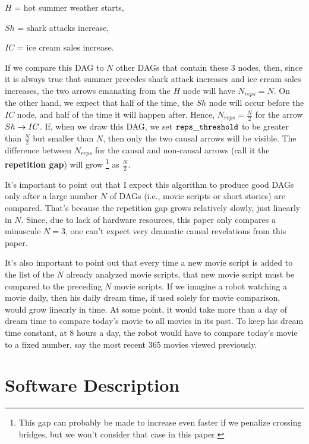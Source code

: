 \documentclass[12pt]{article}
\begin{document}
$H$ = hot summer weather starts,

$Sh$ = shark attacks increase, 

$IC$ = ice cream sales increase.

If we compare this DAG to $N$
other DAGs that contain these 3 nodes,
then, since it is always true
that summer precedes shark
attack increases and ice cream sales increases, the two arrows 
emanating
from the $H$ node 
will have $N_{reps} =N$.
On the other hand, we expect that half of the time, the $Sh$ node will occur before
the $IC$ node,
and half of the time it will happen after.
Hence, $N_{reps}=\frac{N}{2}$ for the
arrow $Sh\rightarrow IC$.
If, when we draw this DAG, we set $\tt reps\_threshold$ to be 
greater than $\frac{N}{2}$
but smaller than $N$,
then only the two causal arrows will be visible. The difference  between
 $N_{reps}$ for the causal and non-causal
 arrows (call it the {\bf repetition gap}) will grow \footnote{This gap
  can probably be made to increase
  even faster if we penalize crossing
  bridges, but 
  we won't consider that case in this paper.}
   as $\frac{N}{2}$.
   
   
 It's important to point out
 that I expect this algorithm
 to produce good DAGs only
 after a large number $N$ of DAGs (i.e.,
 movie scripts or short stories)
 are compared. That's because the repetition gap
 grows relatively slowly, just linearly in $N$. Since,
 due to lack of hardware resources,
 this paper
 only compares a minuscule $N=3$,
 one can't expect very dramatic causal
 revelations from this paper.

It's also important to point out
that every time a new movie script is added to
the list of the $N$ already
analyzed movie scripts,
that new movie script must be compared to the
preceding $N$ movie scripts.
If we imagine a robot watching a movie daily,
then his daily dream time, if used solely
for movie comparison, 
would grow linearly in time.
At some point, it would take more than a day
of dream time to
compare today's movie to all movies in its past.
To keep his dream time constant, at 8 hours a day,
the robot
would have to compare today's movie
to a fixed number, say the most recent 365 movies 
viewed previously.



 

\section{Software Description}
\end{document}
